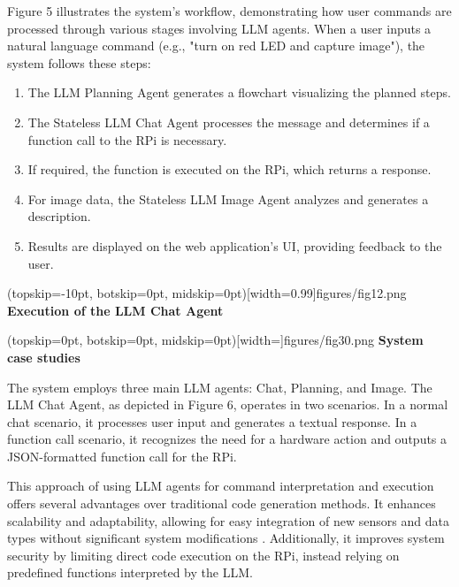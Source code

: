 \documentclass{ieeeaccess}
\begin{document}
Figure 5 illustrates the system's workflow, demonstrating how user commands are processed through various stages involving LLM agents. When a user inputs a natural language command (e.g., "turn on red LED and capture image"), the system follows these steps:

\begin{enumerate}
    \item The LLM Planning Agent generates a flowchart visualizing the planned steps.
    \item The Stateless LLM Chat Agent processes the message and determines if a function call to the RPi is necessary.
    \item If required, the function is executed on the RPi, which returns a response.
    \item For image data, the Stateless LLM Image Agent analyzes and generates a description.
    \item Results are displayed on the web application's UI, providing feedback to the user.
\end{enumerate}

\Figure[b!](topskip=-10pt, botskip=0pt,
midskip=0pt)[width=0.99\columnwidth]{{figures/fig12.png}}
{ \textbf{Execution of the LLM Chat Agent}\label{fig6}}

\Figure[t!](topskip=0pt, botskip=0pt,
midskip=0pt)[width=\textwidth]{{figures/fig30.png}}
{ \textbf{System case studies}\label{fig7}}


The system employs three main LLM agents: Chat, Planning, and Image. The LLM Chat Agent, as depicted in Figure 6, operates in two scenarios. In a normal chat scenario, it processes user input and generates a textual response. In a function call scenario, it recognizes the need for a hardware action and outputs a JSON-formatted function call for the RPi.

This approach of using LLM agents for command interpretation and execution offers several advantages over traditional code generation methods. It enhances scalability and adaptability, allowing for easy integration of new sensors and data types without significant system modifications \cite{yang2023autogptonlinedecisionmaking}. Additionally, it improves system security by limiting direct code execution on the RPi, instead relying on predefined functions interpreted by the LLM.

\end{document}
